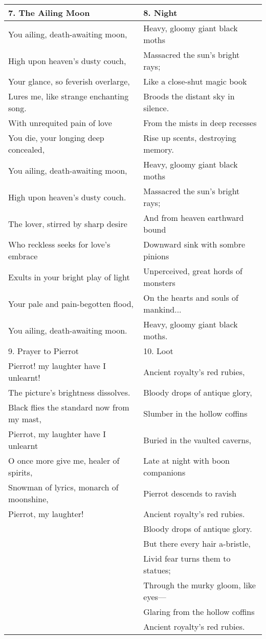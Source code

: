 \newpage
\begin{table}[h!]
\begin{tabular}{p{8.0cm}|p{8.0cm}} \hline

7. The Ailing Moon & 8. Night \\\hline
You ailing, death-awaiting moon, & Heavy, gloomy giant black moths \\
High upon heaven's dusty couch, & Massacred the sun's bright rays; \\
Your glance, so feverish overlarge, & Like a close-shut magic book \\
Lures me, like strange enchanting song. & Broods the distant sky in silence. \\
With unrequited pain of love & From the mists in deep recesses \\
You die, your longing deep concealed, & Rise up scents, destroying memory. \\
You ailing, death-awaiting moon, & Heavy, gloomy giant black moths \\
High upon heaven's dusty couch. & Massacred the sun's bright rays; \\
The lover, stirred by sharp desire & And from heaven earthward bound \\
Who reckless seeks for love's embrace & Downward sink with sombre pinions \\
Exults in your bright play of light & Unperceived, great hords of monsters \\
Your pale and pain-begotten flood, & On the hearts and souls of mankind... \\
You ailing, death-awaiting moon. & Heavy, gloomy giant black moths. \\\hline


9. Prayer to Pierrot & 10. Loot \\\hline
Pierrot! my laughter have I unlearnt!  & Ancient royalty's red rubies, \\
The picture's brightness dissolves. & Bloody drops of antique glory, \\
Black flies the standard now from my mast, & Slumber in the hollow coffins \\
Pierrot, my laughter have I unlearnt& Buried in the vaulted caverns, \\
O once more give me, healer of spirits, & Late at night with boon companions \\
Snowman of lyrics, monarch of moonshine, & Pierrot descends to ravish \\
Pierrot, my laughter! & Ancient royalty's red rubies. \\
&  Bloody drops of antique glory. \\
&  But there every hair a-bristle, \\
&  Livid fear turns them to statues; \\
&  Through the murky gloom, like eyes— \\
&  Glaring from the hollow coffins \\
&  Ancient royalty's red rubies. \\\hline


\end{tabular}
\end{table}
